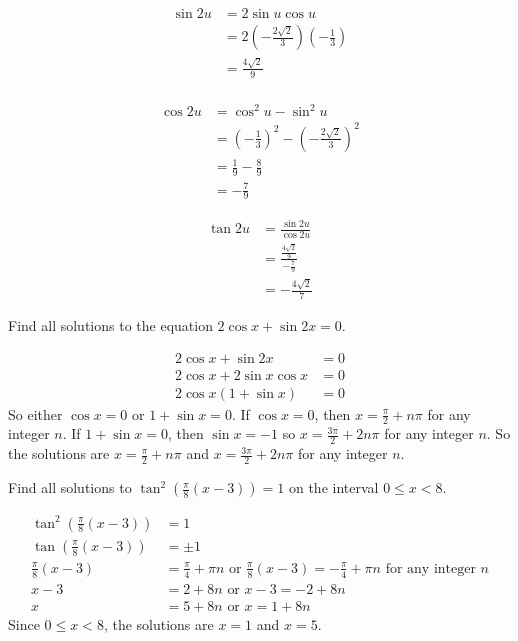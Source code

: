 \documentclass{exam}
\begin{document}
\begin{questions}
\begin{solution}
\begin{minipage}[t]{.3\linewidth}
    \begin{align*}
    \sin2u&=2\sin u\cos u\\
    &=2\left(-\frac{2\sqrt{2}}{3}\right)\left(-\frac{1}{3}\right)\\
    &=\frac{4\sqrt{2}}{9}\\
    \end{align*}
\end{minipage}
\hfill
\begin{minipage}[t]{.3\linewidth}
    \begin{align*}
    \cos2u&=\cos^2 u-\sin^2 u\\
    &=\left(-\frac{1}{3}\right)^2-\left(-\frac{2\sqrt{2}}{3}\right)^2\\
    &=\frac{1}{9}-\frac{8}{9}\\
    &=-\frac{7}{9}
    \end{align*}
\end{minipage}
\hfill
\begin{minipage}[t]{.3\linewidth}
    \begin{align*}
    \tan2u&=\frac{\sin2u}{\cos2u}\\
    &=\frac{\frac{4\sqrt{2}}{9}}{-\frac{7}{9}}\\
    &=-\frac{4\sqrt{2}}{7}
    \end{align*}
\end{minipage}
\end{solution}

\newpage

\question Find all solutions to the equation $2\cos x+\sin 2x=0$.
\begin{solution}
\begin{align*}
2\cos x+\sin 2x&=0\\
2\cos x+2\sin x\cos x&=0\\
2\cos x(1+\sin x)&=0
\end{align*}
So either $\cos x=0$ or $1+\sin x=0$. If $\cos x=0$, then $x=\frac{\pi}{2}+n\pi$ for any integer $n$. If $1+\sin x=0$, then $\sin x=-1$ so $x=\frac{3\pi}{2}+2n\pi$ for any integer $n$. So the solutions are $x=\frac{\pi}{2}+n\pi$ and $x=\frac{3\pi}{2}+2n\pi$ for any integer $n$.
\end{solution}

\question Find all solutions to $\displaystyle\tan^2\left(\frac{\pi}{8}\left(x-3\right)\right)=1$ on the interval $0\le x<8$.
\begin{solution}
\begin{align*}
\tan^2\left(\frac{\pi}{8}\left(x-3\right)\right)&=1\\
\tan\left(\frac{\pi}{8}\left(x-3\right)\right)&=\pm1\\
\frac{\pi}{8}\left(x-3\right)&=\frac{\pi}{4}+\pi n\text{ or }\frac{\pi}{8}\left(x-3\right)=-\frac{\pi}{4}+\pi n\text{ for any integer }n\\
x-3&=2+8n\text{ or }x-3=-2+8n\\
x&=5+8n\text{ or }x=1+8n
\end{align*}
Since $0\le x<8$, the solutions are $x=1$ and $x=5$.

\end{solution}


\end{questions}
\end{document}
